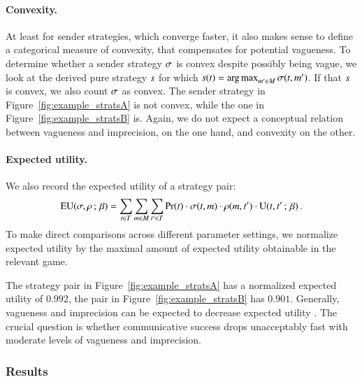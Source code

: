 \paragraph{Convexity.} At least for sender strategies, which converge
faster, it also makes sense to define a categorical measure of
convexity, that compensates for potential vagueness. To determine
whether a sender strategy $\sigma$ is convex despite possibly being
vague, we look at the derived pure strategy $s$ for which
$s(t) = \operatorname*{arg\,max}_{m' \in M}
\sigma(t,m')$. If that $s$ is convex, we also count
$\sigma$ as convex. The sender strategy in
Figure~\ref{fig:example_stratsA} is not convex, while the one in
Figure~\ref{fig:example_stratsB} is. Again, we do not expect a
conceptual relation between vagueness and imprecision, on the one
hand, and convexity on the other.

\paragraph{Expected utility.} We also record the expected utility of
a strategy pair:
\begin{align*}
  \mathrm{EU}(\sigma,\rho \thinspace ; \thinspace \beta) = \sum_{t \in
    T} \sum_{m \in M} \sum_{t' \in T}
  \Pr(t) \cdot \sigma(t, m) \cdot \rho(m,
  t') \cdot \mathrm{U}(t,t' \thinspace ; \thinspace \beta)\,.
\end{align*}
To make direct comparisons across different parameter settings, we
normalize expected utility by the maximal amount of expected utility
obtainable in the relevant game. 

The strategy pair in Figure~\ref{fig:example_stratsA} has a normalized
expected utility of $0.992$, the pair in
Figure~\ref{fig:example_stratsB} has $0.901$. Generally, vagueness and
imprecision can be expected to decrease expected utility
\citep[c.f.][]{Lipman2009:Why-is-Language}. The crucial question is whether
communicative success drops unacceptably fast with moderate levels of
vagueness and imprecision.

\subsubsection{Results}

